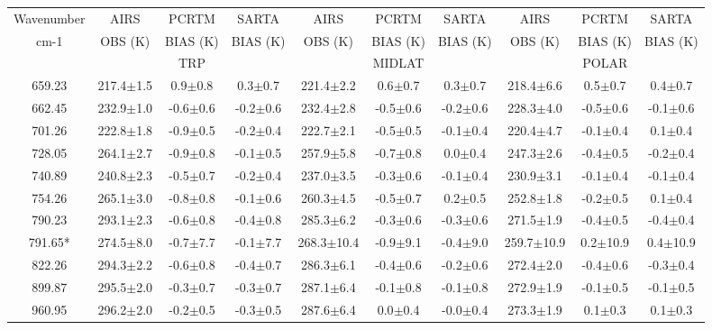 \documentclass[agupp]{aguplus}              %
\begin{document}
\begin{article}
\begin{center}
\begin{table}[ht]
{\footnotesize
\hfill{}
\begin{tabular}{c|ccc|ccc|ccc} %
Wavenumber & AIRS   & PCRTM    & SARTA    & AIRS   & PCRTM    & SARTA    & AIRS   & PCRTM    & SARTA \\
cm-1       & OBS (K)& BIAS (K) & BIAS (K) & OBS (K)& BIAS (K) & BIAS (K) & OBS (K)& BIAS (K) & BIAS (K) \\
           &        & TRP      &          &        & MIDLAT   &          &        & POLAR    &       \\
\hline
659.23 & 217.4$\pm$1.5 &  0.9$\pm$0.8 &  0.3$\pm$0.7 & 221.4$\pm$2.2 &  0.6$\pm$0.7 &  0.3$\pm$0.7 & 218.4$\pm$6.6 &  0.5$\pm$0.7 &  0.4$\pm$0.7 \\ 
662.45 & 232.9$\pm$1.0 & -0.6$\pm$0.6 & -0.2$\pm$0.6 & 232.4$\pm$2.8 & -0.5$\pm$0.6 & -0.2$\pm$0.6 & 228.3$\pm$4.0 & -0.5$\pm$0.6 & -0.1$\pm$0.6 \\ 
701.26 & 222.8$\pm$1.8 & -0.9$\pm$0.5 & -0.2$\pm$0.4 & 222.7$\pm$2.1 & -0.5$\pm$0.5 & -0.1$\pm$0.4 & 220.4$\pm$4.7 & -0.1$\pm$0.4 &  0.1$\pm$0.4 \\ 
728.05 & 264.1$\pm$2.7 & -0.9$\pm$0.8 & -0.1$\pm$0.5 & 257.9$\pm$5.8 & -0.7$\pm$0.8 &  0.0$\pm$0.4 & 247.3$\pm$2.6 & -0.4$\pm$0.5 & -0.2$\pm$0.4 \\ 
740.89 & 240.8$\pm$2.3 & -0.5$\pm$0.7 & -0.2$\pm$0.4 & 237.0$\pm$3.5 & -0.3$\pm$0.6 & -0.1$\pm$0.4 & 230.9$\pm$3.1 & -0.1$\pm$0.4 & -0.1$\pm$0.4 \\ 
754.26 & 265.1$\pm$3.0 & -0.8$\pm$0.8 & -0.1$\pm$0.6 & 260.3$\pm$4.5 & -0.5$\pm$0.7 &  0.2$\pm$0.5 & 252.8$\pm$1.8 & -0.2$\pm$0.5 &  0.1$\pm$0.4 \\ 
790.23 & 293.1$\pm$2.3 & -0.6$\pm$0.8 & -0.4$\pm$0.8 & 285.3$\pm$6.2 & -0.3$\pm$0.6 & -0.3$\pm$0.6 & 271.5$\pm$1.9 & -0.4$\pm$0.5 & -0.4$\pm$0.4 \\ 
791.65* & 274.5$\pm$8.0 & -0.7$\pm$7.7 & -0.1$\pm$7.7 & 268.3$\pm$10.4 & -0.9$\pm$9.1 & -0.4$\pm$9.0 & 259.7$\pm$10.9 &  0.2$\pm$10.9 &  0.4$\pm$10.9 \\ 
\hline
822.26 & 294.3$\pm$2.2 & -0.6$\pm$0.8 & -0.4$\pm$0.7 & 286.3$\pm$6.1 & -0.4$\pm$0.6 & -0.2$\pm$0.6 & 272.4$\pm$2.0 & -0.4$\pm$0.6 & -0.3$\pm$0.4 \\ 
899.87 & 295.5$\pm$2.0 & -0.3$\pm$0.7 & -0.3$\pm$0.7 & 287.1$\pm$6.4 & -0.1$\pm$0.8 & -0.1$\pm$0.8 & 272.9$\pm$1.9 & -0.1$\pm$0.5 & -0.1$\pm$0.5 \\ 
960.95 & 296.2$\pm$2.0 & -0.2$\pm$0.5 & -0.3$\pm$0.5 & 287.6$\pm$6.4 &  0.0$\pm$0.4 & -0.0$\pm$0.4 & 273.3$\pm$1.9 &  0.1$\pm$0.3 &  0.1$\pm$0.3 \\ 

\end{tabular}}
\end{table}
\end{center}
\end{article}
\end{document}

